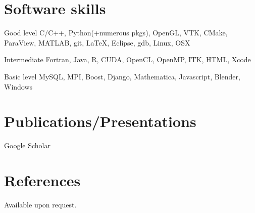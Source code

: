 \documentclass{tccv}
\begin{document}
\section{Software skills}

\begin{factlist}
\item{Good level}
     {C/C++, Python(+numerous pkgs), OpenGL, VTK, CMake, ParaView, MATLAB, git, 
\LaTeX, Eclipse, gdb, Linux, OSX}
 
\item{Intermediate}
     {Fortran, Java, R, CUDA, OpenCL, OpenMP, ITK, HTML, Xcode}

\item{Basic level}
     {MySQL, MPI, Boost, Django, Mathematica, Javascript, Blender, Windows}
\end{factlist}

\section{Publications/Presentations}

\begin{projlist}
\item{}
     {\href{https://scholar.google.com/citations?hl=en&user=0SeiPdoAAAAJ&view_op=list_works&sortby=pubdate}{Google Scholar}}

\end{projlist}

\section{References}

\begin{projlist}
     {Available upon request.}
\end{projlist}
\end{document}
